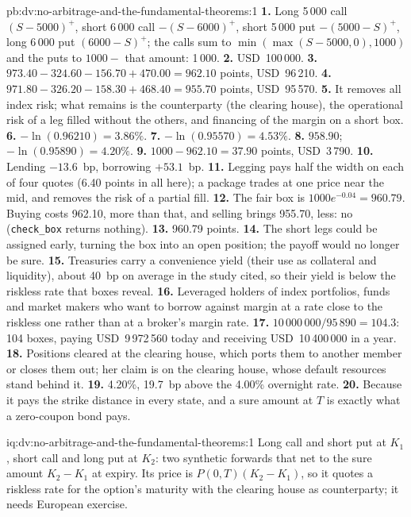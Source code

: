 \begin{solution}{pb:dv:no-arbitrage-and-the-fundamental-theorems:1}
\textbf{1.} Long 5\,000 call $(S-5000)^+$, short 6\,000 call $-(S-6000)^+$, short
5\,000 put $-(5000-S)^+$, long 6\,000 put $(6000-S)^+$; the calls sum to
$\min(\max(S-5000,0),1000)$ and the puts to $1000-$ that amount: 1\,000.
\textbf{2.} USD~100\,000.
\textbf{3.} $973.40-324.60-156.70+470.00=962.10$ points, USD~96\,210.
\textbf{4.} $971.80-326.20-158.30+468.40=955.70$ points, USD~95\,570.
\textbf{5.} It removes all index risk; what remains is the counterparty (the
clearing house), the operational risk of a leg filled without the others, and
financing of the margin on a short box.
\textbf{6.} $-\ln(0.96210)=3.86\%$.
\textbf{7.} $-\ln(0.95570)=4.53\%$.
\textbf{8.} $958.90$; $-\ln(0.95890)=4.20\%$.
\textbf{9.} $1000-962.10=37.90$ points, USD~3\,790.
\textbf{10.} Lending $-13.6$~bp, borrowing $+53.1$~bp.
\textbf{11.} Legging pays half the width on each of four quotes (6.40 points in
all here); a package trades at one price near the mid, and removes the risk of a
partial fill.
\textbf{12.} The fair box is $1000e^{-0.04}=960.79$. Buying costs 962.10, more than
that, and selling brings 955.70, less: no  (\texttt{check\_box} returns
nothing).
\textbf{13.} 960.79 points.
\textbf{14.} The short legs could be assigned early, turning the box into an open
position; the payoff would no longer be sure.
\textbf{15.} Treasuries carry a convenience yield (their use as collateral and
liquidity), about 40~bp on average in the study cited, so their yield is below the
riskless rate that boxes reveal.
\textbf{16.} Leveraged holders of index portfolios, funds and market makers who
want to borrow against margin at a rate close to the riskless one rather than at a
broker's margin rate.
\textbf{17.} $10\,000\,000/95\,890=104.3$: 104 boxes, paying USD~9\,972\,560 today and
receiving USD~10\,400\,000 in a year.
\textbf{18.} Positions cleared at the clearing house, which ports them to another
member or closes them out; her claim is on the clearing house, whose default
resources stand behind it.
\textbf{19.} 4.20\%, 19.7~bp above the 4.00\% overnight rate.
\textbf{20.} Because it pays the strike distance in every state, and a sure amount
at $T$ is exactly what a zero-coupon bond pays.
\end{solution}

\begin{solution}{iq:dv:no-arbitrage-and-the-fundamental-theorems:1}
Long call and short put at $K_1$, short call and long put at $K_2$: two synthetic
forwards that net to the sure amount $K_2-K_1$ at expiry. Its price is
$P(0,T)(K_2-K_1)$, so it quotes a riskless rate for the option's maturity with the
clearing house as counterparty; it needs European exercise.
\end{solution}

